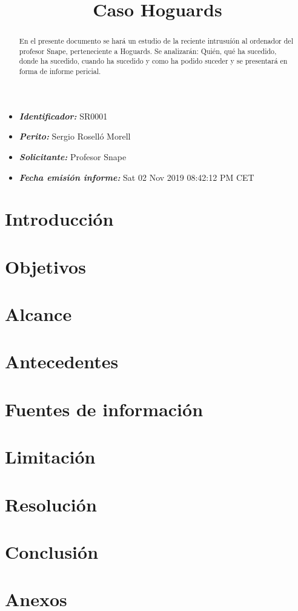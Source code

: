 \documentclass[a4paper,11pt]{article}
\title{{\Huge Caso Hoguards}}
\date{}
\begin{document}
\begin{titlepage}
\maketitle
  \begin{itemize}
    \item[] \textbf{\textit{Identificador:}} SR0001
    \item[] \textbf{\textit{Perito:}} Sergio Roselló Morell
    \item[] \textbf{\textit{Solicitante:}} Profesor Snape
    \item[] \textbf{\textit{Fecha emisión informe:}} Sat 02 Nov 2019 08:42:12 PM CET
  \end{itemize}
\end{titlepage}

\begin{abstract}
En el presente documento se hará un estudio de la reciente intrusuíón al ordenador del profesor Snape, perteneciente a Hoguards. Se analizarán: Quién, qué ha sucedido, donde ha sucedido, cuando ha sucedido y como ha podido suceder y se presentará en forma de informe pericial.
\end{abstract}

\clearpage

\tableofcontents

\clearpage

\section{Introducción}

\section{Objetivos}

\section{Alcance}

\section{Antecedentes}

\section{Fuentes de información}

\section{Limitación}

\section{Resolución}

\section{Conclusión}

\section{Anexos}


\printbibliography
\end{document}
